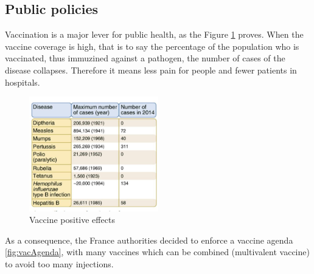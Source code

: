 \documentclass{article}
\begin{document}

        \subsection{Public policies}
 
            Vaccination is a major lever for public health, as the Figure \ref{fig:numberofcases} proves.
            When the vaccine coverage is high, that is to say the percentage of the population who is vaccinated, thus immuzined against a pathogen, 
                the number of cases of the disease collapses.
            Therefore it means less pain for people and fewer patients in hospitals.
                
            \begin{figure}
                \centering
                \includegraphics[width=0.5\textwidth]{imgs/NumberOfCases.JPG}
                \caption{Vaccine positive effects}
                \label{fig:numberofcases}
            \end{figure}

            As a consequence, the France authorities decided to enforce a vaccine agenda \ref{fig:vacAgenda}, with many vaccines
                which can be combined (multivalent vaccine) to avoid too many injections.
            
\end{document}
